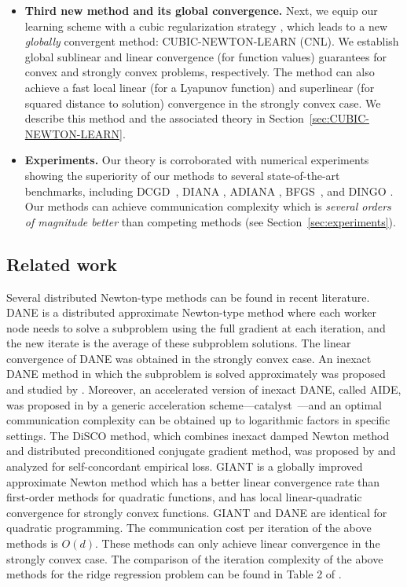 \documentclass[12pt]{article}
\begin{document}
\begin{itemize}
\item {\bf Third new method and its global convergence.} Next, we equip our learning scheme with a  cubic regularization strategy \citep{Griewank-cubic-1981, PN2006-cubic}, which  leads to a new {\em globally} convergent method: {\sf CUBIC-NEWTON-LEARN (CNL)}. We establish global sublinear and linear convergence (for function values) guarantees for convex and strongly convex problems, respectively. The method can also achieve a fast local linear (for a Lyapunov function) and superlinear (for squared distance to solution) convergence in the strongly convex case.  We describe this method and the associated theory in Section~\ref{sec:CUBIC-NEWTON-LEARN}.


\item {\bf Experiments.} Our theory is corroborated with numerical experiments showing the superiority of our methods to several state-of-the-art benchmarks, including DCGD~\citep{KFJ}, DIANA \citep{DIANA, DIANA2}, ADIANA \citep{ADIANA}, BFGS~\cite{Broyden1967, Fletcher1970, Goldfarb1970, shanno1970conditioning}, and DINGO \citep{DINGO2019}.  Our methods can achieve communication complexity which is {\em several orders of magnitude better} than  competing methods (see Section~\ref{sec:experiments}).
\end{itemize}






\subsection{Related work}

Several distributed Newton-type methods can be found in recent literature. DANE \citep{DANE} is a distributed approximate Newton-type method where each worker node needs to solve a subproblem using the full gradient at each iteration, and the new iterate is the average of these subproblem solutions. The linear convergence of DANE was obtained in the strongly convex case. An inexact DANE method in which the subproblem is solved approximately was proposed and studied by \citet{AIDE}. Moreover, an accelerated version of inexact DANE, called AIDE, was proposed in  \citep{AIDE} by a generic acceleration scheme---catalyst~\citep{lin2015universal}---and an optimal communication complexity can be obtained up to logarithmic factors in specific settings. The DiSCO method, which combines inexact damped Newton method and distributed preconditioned conjugate gradient method, was proposed by \citet{DISCO} and analyzed for self-concordant empirical loss. GIANT \citep{GIANT2018} is a globally improved approximate Newton method which has a better linear convergence rate than first-order methods for quadratic functions, and has local linear-quadratic convergence for strongly convex functions. GIANT and DANE are identical for quadratic programming. The communication cost per iteration of the above methods is $O(d)$. These methods can only achieve linear convergence in the strongly convex case. The comparison of the iteration complexity of the above methods for the ridge regression problem can be found in Table 2 of \citep{GIANT2018}. 
\end{document}
